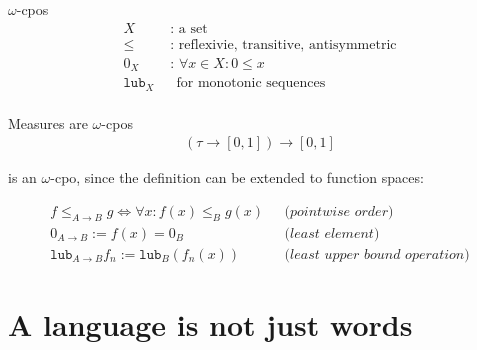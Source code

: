 \documentclass{beamer}
\begin{document}

\begin{frame}{$\omega$-cpos}
  \begin{align*}
    X & \text{ : a set}\\
    \leq & \text{ : reflexivie, transitive, antisymmetric}\\
    0_X &\text{ : } \forall x \in X : 0 \leq x\\
    \texttt{lub}_X &~~\text{ for monotonic sequences}\\
  \end{align*}
\end{frame}


\begin{frame}{Measures are $\omega$-cpos}
  \begin{align*}
    (\tau\to[0,1])\to[0,1]
  \end{align*}
  \pause
  \begin{center}
    is an $\omega$-cpo, since the definition can be extended to function spaces: 
  \end{center}
  \pause
  \begin{align*}
    f\leq_{A \to B} g \Leftrightarrow \forall x: f(x) \leq_B g(x)
    & ~~~\textit{(pointwise order)}\\
    0_{A\to B} := f(x) = 0_B
    & ~~~\textit{(least element)}\\
    \texttt{lub}_{A\to B} f_n := \texttt{lub}_B(f_n(x))
    & ~~~\textit{(least upper bound operation)}
  \end{align*}
\end{frame}


\section{A language is not just words}

\end{document}
